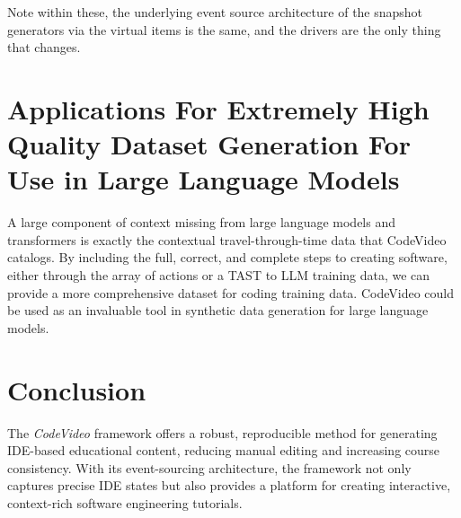 \documentclass[11pt, a4paper]{article}
\begin{document}
Note within these, the underlying event source architecture of the snapshot generators via the virtual items is the same, and the drivers are the only thing that changes.

\section{Applications For Extremely High Quality Dataset Generation For Use in Large Language Models}

A large component of context missing from large language models and transformers is exactly the contextual travel-through-time data that CodeVideo catalogs. By including the full, correct, and complete steps to creating software, either through the array of actions or a TAST to LLM training data, we can provide a more comprehensive dataset for coding training data. CodeVideo could be used as an invaluable tool in synthetic data generation for large language models.

\section{Conclusion}

The \textit{CodeVideo} framework offers a robust, reproducible method for generating IDE-based educational content, reducing manual editing and increasing course consistency. With its event-sourcing architecture, the framework not only captures precise IDE states but also provides a platform for creating interactive, context-rich software engineering tutorials.

\printbibliography
\end{document}
